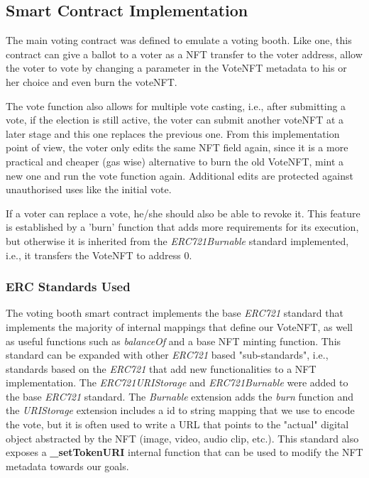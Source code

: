 \documentclass[../main.tex]{subfiles}
\begin{document}
\subsection{Smart Contract Implementation}
The main voting contract was defined to emulate a voting booth. Like one, this contract can give a ballot to a voter as a NFT transfer to the voter address, allow the voter to vote by changing a parameter in the VoteNFT metadata to his or her choice and even burn the voteNFT.
\par
The vote function also allows for multiple vote casting, i.e., after submitting a vote, if the election is still active, the voter can submit another voteNFT at a later stage and this one replaces the previous one. From this implementation point of view, the voter only edits the same NFT field again, since it is a more practical and cheaper (gas wise) alternative to burn the old VoteNFT, mint a new one and run the vote function again. Additional edits are protected against unauthorised uses like the initial vote.
\par
If a voter can replace a vote, he/she should also be able to revoke it. This feature is established by a 'burn' function that adds more requirements for its execution, but otherwise it is inherited from the \textit{ERC721Burnable} standard implemented, i.e., it transfers the VoteNFT to address 0.

\subsubsection{ERC Standards Used}
The voting booth smart contract implements the base \textit{ERC721} standard that implements the majority of internal mappings that define our VoteNFT, as well as useful functions such as \textit{balanceOf} and a base NFT minting function. This standard can be expanded with other \textit{ERC721} based "sub-standards", i.e., standards based on the \textit{ERC721} that add new functionalities to a NFT implementation. The \textit{ERC721URIStorage} and \textit{ERC721Burnable} were added to the base \textit{ERC721} standard. The \textit{Burnable} extension adds the \textit{burn} function and the \textit{URIStorage} extension includes a id to string mapping that we use to encode the vote, but it is often used to write a URL that points to the "actual" digital object abstracted by the NFT (image, video, audio clip, etc.). This standard also exposes a \textbf{\_setTokenURI} internal function that can be used to modify the NFT metadata towards our goals.
\end{document}
